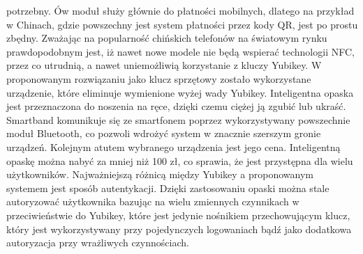 potrzebny. Ów moduł służy głównie do płatności mobilnych, dlatego na przykład w Chinach, gdzie powszechny jest system płatności przez kody QR\cite{Mobile-Payments-China}, jest po prostu zbędny. Zważając na popularność chińskich telefonów na światowym rynku prawdopodobnym jest, iż nawet nowe modele nie będą wspierać technologii NFC, przez co utrudnią, a nawet uniemożliwią korzystanie z kluczy Yubikey.
\newline\newline
\indent W proponowanym rozwiązaniu jako klucz sprzętowy zostało wykorzystane urządzenie, które eliminuje wymienione wyżej wady Yubikey. Inteligentna opaska
jest przeznaczona do noszenia na ręce, dzięki czemu ciężej ją zgubić lub ukraść. Smartband komunikuje się ze smartfonem poprzez wykorzystywany
powszechnie moduł Bluetooth, co pozwoli wdrożyć system w znacznie szerszym gronie urządzeń. Kolejnym atutem wybranego urządzenia jest jego cena.
Inteligentną opaskę można nabyć za mniej niż 100 zł, co sprawia, że jest przystępna dla wielu użytkowników. Najważniejszą różnicą między Yubikey a
proponowanym systemem jest sposób autentykacji. Dzięki zastosowaniu opaski można stale autoryzować użytkownika bazując na wielu zmiennych czynnikach w
przeciwieństwie do Yubikey, które jest jedynie nośnikiem przechowującym klucz, który jest wykorzystywany przy pojedynczych logowaniach bądź
jako dodatkowa autoryzacja przy wrażliwych czynnościach.
